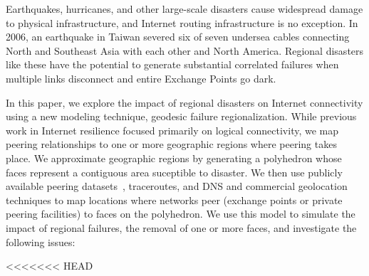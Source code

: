 

Earthquakes, hurricanes, and other large-scale disasters cause widespread damage
to physical infrastructure, and Internet routing infrastructure is no exception.
In 2006, an earthquake in Taiwan severed six of seven 
undersea cables connecting North and Southeast Asia with each other and North 
America. 
Regional disasters like these have the potential to generate substantial 
correlated failures when multiple links disconnect and entire Exchange Points
go dark.


In this paper, we explore the impact of regional disasters on Internet
connectivity using a new modeling technique, geodesic failure regionalization.
While previous work in Internet resilience focused primarily on logical
connectivity, we map peering relationships to one or more geographic regions
where peering takes place.  We approximate geographic regions by generating a
polyhedron whose faces represent a contiguous area suceptible to disaster.  We
then use publicly available peering datasets~\cite{brice, peeringdb},
traceroutes, and DNS and commercial geolocation techniques to map locations
where networks peer (exchange points or private peering facilities) to faces on
the polyhedron.  We use this model to simulate the impact of regional failures,
\ie{} the removal of one or more faces, and investigate the following issues:

<<<<<<< HEAD

